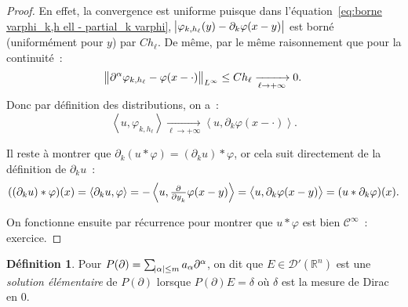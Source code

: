\documentclass{report}
\newcommand{\R}{{\mathbb R}}
\newcommand{\scpr}[2]{\left\langle#1, #2\right\rangle}
\newcommand{\pinfty}{{+\infty}}
\theoremstyle{definition}
\newtheorem{déf}[thm]{Définition}
\theoremstyle{remark}
\begin{document}
\begin{proof}
En effet, la convergence est uniforme puisque dans l'équation~\eqref{eq:borne varphi_k,h ell - partial_k varphi}, $\abs {\varphi_{k,h_\ell}(y)-\partial_k\varphi(x-y)}$ est borné
(uniformément pour $y$) par $Ch_\ell$. De même, par le même raisonnement que pour la continuité~:
\[\norm {\partial^\alpha\varphi_{k,h_\ell} - \varphi(x-\cdot)}_{L^\infty} \leq Ch_\ell \xrightarrow[\ell \to \pinfty]{} 0.\]
Donc par définition des distributions, on a~:
\[\scpr u{\varphi_{k,h_\ell}} \xrightarrow[\ell \to \pinfty]{} \scpr u{\partial_k\varphi(x-\cdot)}.\]

Il reste à montrer que $\partial_k(u*\varphi) = (\partial_ku) * \varphi$, or cela suit directement de la définition de $\partial_ku$~:
\[((\partial_ku)*\varphi)(x) = \scpr {\partial_ku}\varphi = -\scpr u{\pd{}{y_k}\varphi(x-y)} = \scpr u{\partial_k\varphi(x-y)} = (u * \partial_k\varphi)(x).\]

On fonctionne ensuite par récurrence pour montrer que $u*\varphi$ est bien $\mathcal C^\infty$~: exercice.
\end{proof}

\begin{déf} Pour $P(\partial) = \sum_{\abs\alpha \leq m}a_\alpha\partial^\alpha$, on dit que $E \in \mathcal D'(\R^n)$ est une \textit{solution élémentaire} de $P(\partial)$
lorsque $P(\partial)E = \delta$ où $\delta$ est la mesure de Dirac en $0$.
\end{déf}
\end{document}
